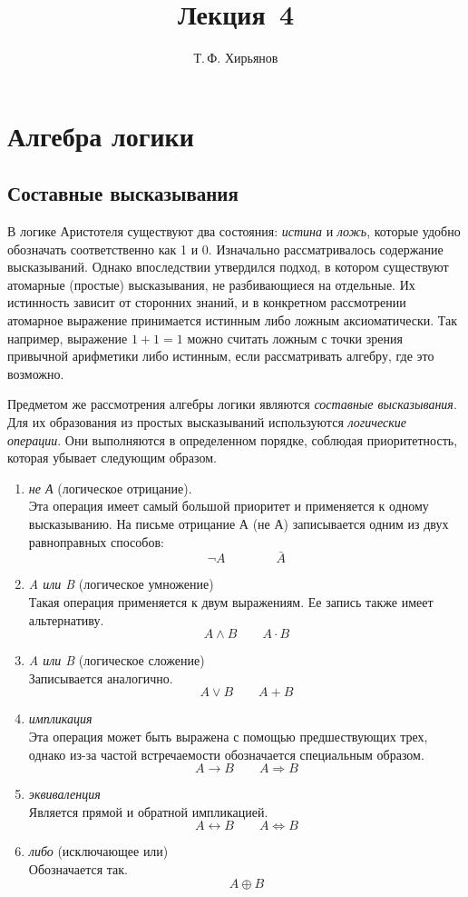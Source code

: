 \documentclass[a4paper, fleqn]{article}
\title{Лекция \textnumero\,4}
\author{Т.\,Ф. Хирьянов}
\date{}
\begin{document}
	\maketitle
	\section*{Алгебра логики}
	\subsection*{Составные высказывания}
	
	В логике Аристотеля существуют два состояния: \emph{истина} и \emph{ложь}, которые удобно обозначать соответственно как 1 и 0. 
	Изначально рассматривалось содержание высказываний. Однако впоследствии утвердился подход, в котором существуют атомарные (простые) высказывания, не разбивающиеся на отдельные. Их истинность зависит от сторонних знаний, и в конкретном рассмотрении атомарное выражение принимается истинным либо ложным аксиоматически. Так например, выражение 
	$1+1=1$
	можно считать ложным с точки зрения привычной арифметики либо истинным, если рассматривать алгебру, где это возможно. 
	
	Предметом же рассмотрения алгебры логики являются \emph{составные высказывания}. Для их образования из простых высказываний используются \emph{логические операции}. Они выполняются в определенном порядке, соблюдая приоритетность, которая убывает следующим образом.
	\begin{enumerate}
		\item \emph{не А} (логическое отрицание). \\
		Эта операция имеет самый большой приоритет и применяется к одному высказыванию. На письме отрицание А (не А) записывается одним из двух равноправных способов:
		\[\neg A \qquad \qquad \bar{A}\]
		\item \emph{A или B} (логическое умножение)\\
		Такая операция применяется к двум выражениям. Ее запись также имеет альтернативу.
		\[A \wedge B \qquad A \cdot B\]
		\item \emph{A или B} (логическое сложение)\\
		Записывается аналогично.
		\[A \vee B \qquad A + B\]
		\item \emph{импликация} \\
		Эта операция может быть выражена с помощью предшествующих трех, однако из-за частой встречаемости обозначается специальным образом.
		\[A \rightarrow B \qquad A \Rightarrow B\]
		\item \emph{эквиваленция}\\
		Является прямой и обратной импликацией. 
		\[A \leftrightarrow B \qquad A \Leftrightarrow B\]
		\item \emph{либо} (исключающее или)\\
		Обозначается так.
		\[A \oplus B\]
		
	\end{enumerate}
	
\end{document}
